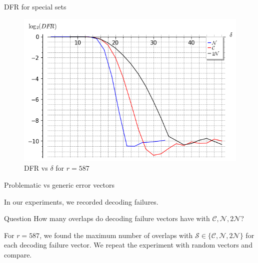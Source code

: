\begin{frame}{DFR for special sets}
    \begin{figure}
    \centering
    \includegraphics[scale=.6]{Images/DFR_20bit_CN2N_new.png}
    \caption{DFR vs $\delta$ for $r=587$}
\end{figure}

\end{frame}

\begin{frame}{Problematic vs generic error vectors}
    
    In our experiments, we recorded decoding failures. 
    
    \begin{block}{Question}
    How many overlaps do decoding failure vectors have with $\mathcal{C},\mathcal{N}, 2\mathcal{N}$?
    \end{block}
    
    For $r = 587$, we found the maximum number of overlaps with $\mathcal{S} \in \{\mathcal{C},\mathcal{N}, 2\mathcal{N} \} $ for each decoding failure vector. We repeat the experiment with random vectors and compare. 
    
\end{frame}


